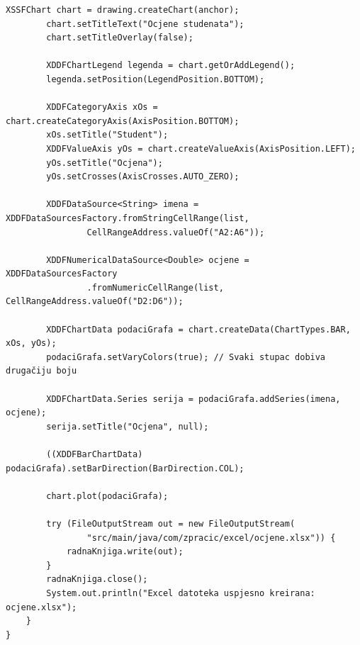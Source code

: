 \documentclass[]{foi}
\begin{document}
\begin{lstlisting}[style=Java, caption=Excel izvještaj]
        XSSFChart chart = drawing.createChart(anchor);
        chart.setTitleText("Ocjene studenata");
        chart.setTitleOverlay(false);

        XDDFChartLegend legenda = chart.getOrAddLegend();
        legenda.setPosition(LegendPosition.BOTTOM);

        XDDFCategoryAxis xOs = chart.createCategoryAxis(AxisPosition.BOTTOM);
        xOs.setTitle("Student");
        XDDFValueAxis yOs = chart.createValueAxis(AxisPosition.LEFT);
        yOs.setTitle("Ocjena");
        yOs.setCrosses(AxisCrosses.AUTO_ZERO);

        XDDFDataSource<String> imena = XDDFDataSourcesFactory.fromStringCellRange(list,
                CellRangeAddress.valueOf("A2:A6"));

        XDDFNumericalDataSource<Double> ocjene = XDDFDataSourcesFactory
                .fromNumericCellRange(list, CellRangeAddress.valueOf("D2:D6"));

        XDDFChartData podaciGrafa = chart.createData(ChartTypes.BAR, xOs, yOs);
        podaciGrafa.setVaryColors(true); // Svaki stupac dobiva drugačiju boju

        XDDFChartData.Series serija = podaciGrafa.addSeries(imena, ocjene);
        serija.setTitle("Ocjena", null);

        ((XDDFBarChartData) podaciGrafa).setBarDirection(BarDirection.COL);

        chart.plot(podaciGrafa);
        
        try (FileOutputStream out = new FileOutputStream(
                "src/main/java/com/zpracic/excel/ocjene.xlsx")) {
            radnaKnjiga.write(out);
        }
        radnaKnjiga.close();
        System.out.println("Excel datoteka uspjesno kreirana: ocjene.xlsx");
    }
}
\end{lstlisting}
\end{document}
